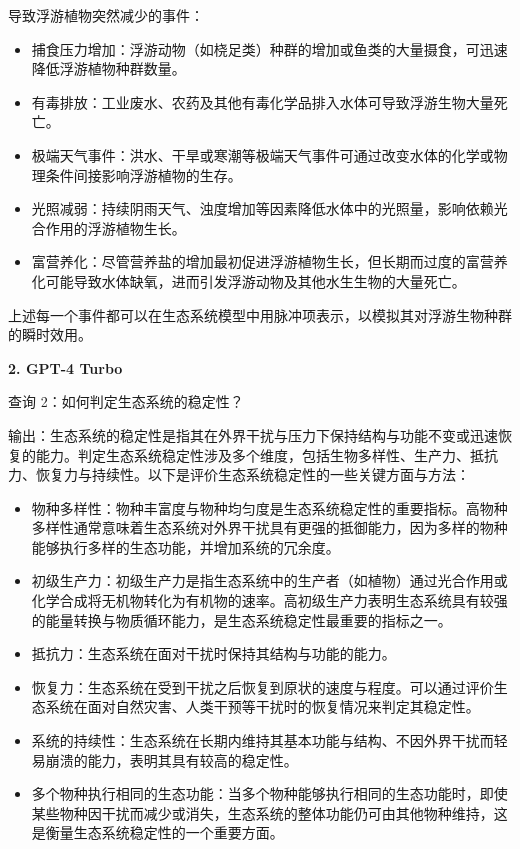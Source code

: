 \documentclass[11pt,a4paper]{ctexart}
\begin{document}
导致浮游植物突然减少的事件：

\begin{itemize}
\item 捕食压力增加：浮游动物（如桡足类）种群的增加或鱼类的大量摄食，可迅速降低浮游植物种群数量。
\item 有毒排放：工业废水、农药及其他有毒化学品排入水体可导致浮游生物大量死亡。
\item 极端天气事件：洪水、干旱或寒潮等极端天气事件可通过改变水体的化学或物理条件间接影响浮游植物的生存。
\item 光照减弱：持续阴雨天气、浊度增加等因素降低水体中的光照量，影响依赖光合作用的浮游植物生长。
\item 富营养化：尽管营养盐的增加最初促进浮游植物生长，但长期而过度的富营养化可能导致水体缺氧，进而引发浮游动物及其他水生生物的大量死亡。
\end{itemize}

上述每一个事件都可以在生态系统模型中用脉冲项表示，以模拟其对浮游生物种群的瞬时效用。

\textbf{2. GPT-4 Turbo}

查询 2：如何判定生态系统的稳定性？

输出：生态系统的稳定性是指其在外界干扰与压力下保持结构与功能不变或迅速恢复的能力。判定生态系统稳定性涉及多个维度，包括生物多样性、生产力、抵抗力、恢复力与持续性。以下是评价生态系统稳定性的一些关键方面与方法：

\begin{itemize}
\item 物种多样性：物种丰富度与物种均匀度是生态系统稳定性的重要指标。高物种多样性通常意味着生态系统对外界干扰具有更强的抵御能力，因为多样的物种能够执行多样的生态功能，并增加系统的冗余度。
\item 初级生产力：初级生产力是指生态系统中的生产者（如植物）通过光合作用或化学合成将无机物转化为有机物的速率。高初级生产力表明生态系统具有较强的能量转换与物质循环能力，是生态系统稳定性最重要的指标之一。
\item 抵抗力：生态系统在面对干扰时保持其结构与功能的能力。
\item 恢复力：生态系统在受到干扰之后恢复到原状的速度与程度。可以通过评价生态系统在面对自然灾害、人类干预等干扰时的恢复情况来判定其稳定性。
\item 系统的持续性：生态系统在长期内维持其基本功能与结构、不因外界干扰而轻易崩溃的能力，表明其具有较高的稳定性。
\item 多个物种执行相同的生态功能：当多个物种能够执行相同的生态功能时，即使某些物种因干扰而减少或消失，生态系统的整体功能仍可由其他物种维持，这是衡量生态系统稳定性的一个重要方面。
\end{itemize}
\end{document}
